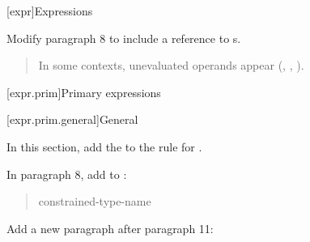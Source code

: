 

\setcounter{chapter}{4}
[expr]{Expressions}

Modify paragraph 8 to include a reference to s.

\begin{quote}
\pnum
In some contexts, unevaluated operands appear
(\added{\ref{expr.prim.req}, }, , 
).
\end{quote}

[expr.prim]{Primary expressions}

[expr.prim.general]{General}

In this section, add the
 to the rule for 
.

\begin{quote}
\begin{bnf}
\br
    \br
\end{bnf}
\end{quote}

In paragraph 8, add  to :

\begin{quote}
\setcounter{Paras}{7}
\pnum
\begin{bnf}
\br
     \terminal{::}\br
    constrained-type-name \terminal{::}
\end{bnf}
\end{quote}

Add a new paragraph after paragraph 11:

